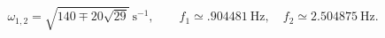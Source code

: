 \[\omega_{1,2}=\sqrt{140\mp20\sqrt{29}}\ \mathrm{s}^{-1},\qquad
f_1\simeq .904481\ \mathrm{Hz},\quad f_2\simeq2.504875\ \mathrm{Hz}.\]
